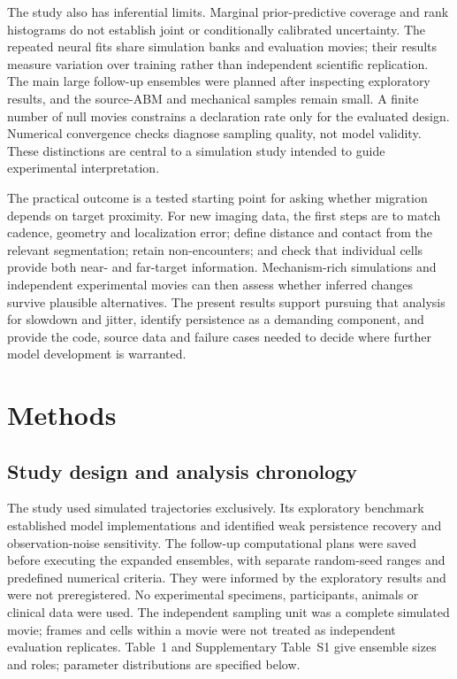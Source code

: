 \documentclass[12pt]{article}
\begin{document}
The study also has inferential limits. Marginal prior-predictive coverage and rank histograms do not establish joint or conditionally calibrated uncertainty\citep{talts2018,sailynoja2022}. The repeated neural fits share simulation banks and evaluation movies; their results measure variation over training rather than independent scientific replication. The main large follow-up ensembles were planned after inspecting exploratory results, and the source-ABM and mechanical samples remain small. A finite number of null movies constrains a declaration rate only for the evaluated design. Numerical convergence checks diagnose sampling quality, not model validity. These distinctions are central to a simulation study intended to guide experimental interpretation\citep{morris2019}.

The practical outcome is a tested starting point for asking whether migration depends on target proximity. For new imaging data, the first steps are to match cadence, geometry and localization error; define distance and contact from the relevant segmentation; retain non-encounters; and check that individual cells provide both near- and far-target information. Mechanism-rich simulations and independent experimental movies can then assess whether inferred changes survive plausible alternatives. The present results support pursuing that analysis for slowdown and jitter, identify persistence as a demanding component, and provide the code, source data and failure cases needed to decide where further model development is warranted.

\section*{Methods}
\subsection*{Study design and analysis chronology}
The study used simulated trajectories exclusively. Its exploratory benchmark established model implementations and identified weak persistence recovery and observation-noise sensitivity. The follow-up computational plans were saved before executing the expanded ensembles, with separate random-seed ranges and predefined numerical criteria. They were informed by the exploratory results and were not preregistered. No experimental specimens, participants, animals or clinical data were used. The independent sampling unit was a complete simulated movie; frames and cells within a movie were not treated as independent evaluation replicates. Table~1 and Supplementary Table~S1 give ensemble sizes and roles; parameter distributions are specified below.
\end{document}
